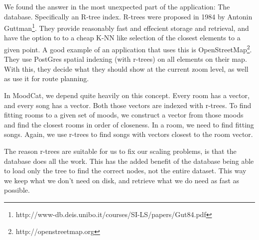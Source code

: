 We found the answer in the most unexpected part of the application: The database.
Specifically an R-tree index.
R-trees were proposed in 1984 by Antonin Guttman\footnote{http://www-db.deis.unibo.it/courses/SI-LS/papers/Gut84.pdf}. 
They provide reasonably fast and effecient storage and retrieval, and have the option to to a cheap K-NN like selection of the closest elements to a given point.
A good example of an application that uses this is OpenStreetMap\footnote{http://openstreetmap.org}.
They use PostGres spatial indexing (with r-trees) on all elements on their map.
With this, they decide what they should show at the current zoom level, as well as use it for route planning.

In MoodCat, we depend quite heavily on this concept.
Every room has a vector, and every song has a vector.
Both those vectors are indexed with r-trees.
To find fitting rooms to a given set of moods, we construct a vector from those moods and find the closest rooms in order of closeness.
In a room, we need to find fitting songs.
Again, we use r-trees to find songs with vectors closest to the room vector.

The reason r-trees are suitable for us to fix our scaling problems, is that the database does all the work.
This has the added benefit of the database being able to load only the tree to find the correct nodes, not the entire dataset.
This way we keep what we don't need on disk, and retrieve what we do need as fast as possible.